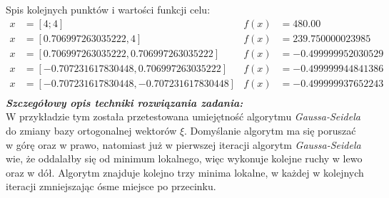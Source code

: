 \documentclass[a4paper,12pt]{article}
\begin{document}
Spis kolejnych punktów i wartości funkcji celu:
\begin{align*}
x &= [4; 4] & f(x) &= 480.00 \\
x &= [0.706997263035222, 4] & f(x) &= 239.750000023985 \\
x &= [0.706997263035222, 0.706997263035222] & f(x) &= -0.499999952030529 \\
x &= [-0.707231617830448, 0.706997263035222] & f(x) &= -0.499999944841386 \\
x &= [-0.707231617830448,-0.707231617830448] & f(x) &= -0.499999937652243 \\
\end{align*}
\newline
\textbf{\textit{Szczegółowy opis techniki rozwiązania zadania:}} \\
W przykładzie tym została przetestowana umiejętność algorytmu \textit{Gaussa-Seidela} do zmiany bazy ortogonalnej wektorów $\xi$. Domyślanie algorytm ma się poruszać w górę oraz w prawo, natomiast już w pierwszej iteracji algorytm \textit{Gaussa-Seidela} wie, że oddalałby się od minimum lokalnego, więc wykonuje kolejne ruchy w lewo oraz w dół. Algorytm znajduje kolejno trzy minima lokalne, w każdej w kolejnych iteracji zmniejszając ósme miejsce po przecinku.

\newpage
\end{document}
